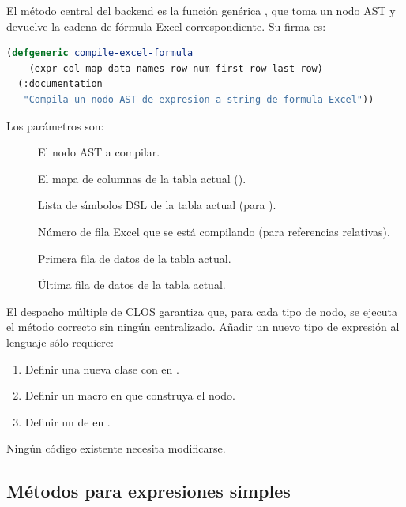 El m\'etodo central del backend es la funci\'on gen\'erica
, que toma un nodo AST y devuelve la cadena de
f\'ormula Excel correspondiente.  Su firma es:

\begin{lstlisting}[language=CommonLisp,
  caption={Declaraci\'on de compile-excel-formula.}]
(defgeneric compile-excel-formula
    (expr col-map data-names row-num first-row last-row)
  (:documentation
   "Compila un nodo AST de expresion a string de formula Excel"))
\end{lstlisting}

Los par\'ametros son:
\begin{description}
  \item[] El nodo AST a compilar.
  \item[] El mapa de columnas de la tabla actual
    ().
  \item[] Lista de s\'{\i}mbolos DSL de la tabla actual
    (para ).
  \item[] N\'umero de fila Excel que se est\'a compilando
    (para referencias relativas).
  \item[] Primera fila de datos de la tabla actual.
  \item[] \'Ultima fila de datos de la tabla actual.
\end{description}

El despacho m\'ultiple de CLOS garantiza que, para cada tipo de nodo, se
ejecuta el m\'etodo correcto sin ning\'un  centralizado.
A\~nadir un nuevo tipo de expresi\'on al lenguaje s\'olo requiere:
\begin{enumerate}
  \item Definir una nueva clase con  en .
  \item Definir un macro en  que construya el nodo.
  \item Definir un  de  en
    .
\end{enumerate}

Ning\'un c\'odigo existente necesita modificarse.

\subsection{M\'etodos para expresiones simples}
\label{ssec:metodos-simples}

